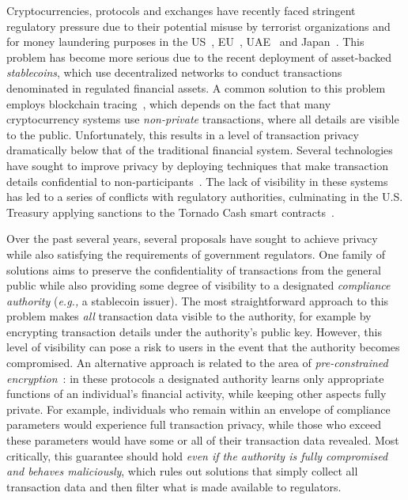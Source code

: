 Cryptocurrencies, protocols and exchanges have recently faced stringent regulatory pressure due to their potential misuse by terrorist organizations and for money laundering purposes in the US~\cite{regulation1}, EU~\cite{regulation4}, UAE~\cite{regulation2} and Japan~\cite{regulation3}.
This problem has become more serious due to the recent deployment of asset-backed \emph{stablecoins},
which use decentralized networks to conduct transactions denominated in regulated financial assets.
A common solution to this problem employs {blockchain tracing}~\cite{meiklejohn2013fistful}, which depends on the fact that many cryptocurrency systems use \emph{non-private} transactions, where all details are visible to the public.
Unfortunately, this results in a level of transaction privacy dramatically below that of the traditional financial system.
Several technologies have sought to improve privacy by deploying techniques  that make transaction details confidential to non-participants~\cite{SP:BCGGMT14, EPRINT:Noether15, pertsev2019tornado,  SP:KMSWP16}.
The lack of visibility in these systems has led to a series of conflicts with regulatory authorities, culminating in the U.S. Treasury applying sanctions to the Tornado Cash smart contracts~\cite{Treasury2022TornadoCash}.

Over the past several years, several proposals have sought to achieve privacy while also satisfying the requirements of government regulators.
One family of solutions aims to preserve the confidentiality of transactions from {the general public} while also providing some degree of visibility to a designated \emph{compliance authority} ({\em e.g.,} a stablecoin  issuer).
The most straightforward approach to this problem makes \emph{all} transaction data visible to the authority, for example by encrypting transaction details under the authority's public key.
However, this level of visibility can pose a risk to users in the event that the authority becomes compromised.
An alternative approach is related to the area of \emph{pre-constrained encryption}~\cite{ITCS:AJJM22}: in these protocols a designated authority learns only appropriate functions of an individual's financial activity, while keeping other aspects fully private. %
For example, individuals who remain within an envelope of compliance parameters would experience full transaction privacy, while those who exceed these parameters would have some or all of their transaction data revealed.
Most critically, this guarantee should hold \emph{even if the authority is fully compromised and behaves maliciously}, which rules out solutions that simply collect all transaction data and then filter what is made available to regulators.

